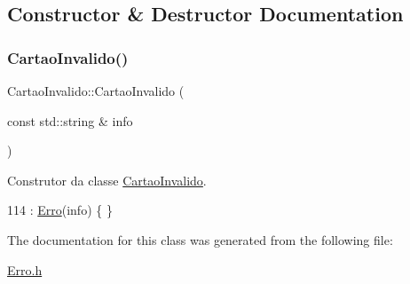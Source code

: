\subsection{Constructor \& Destructor Documentation}
\mbox{\label{classCartaoInvalido_a24653e20aedf639b42cd9ed8a56bdc83}} 
\subsubsection{\texorpdfstring{Cartao\+Invalido()}{CartaoInvalido()}}
{\footnotesize\ttfamily Cartao\+Invalido\+::\+Cartao\+Invalido (\begin{DoxyParamCaption}\item[{const std\+::string \&}]{info }\end{DoxyParamCaption})\hspace{0.3cm}{\ttfamily [inline]}}



Construtor da classe \hyperlink{classCartaoInvalido}{Cartao\+Invalido}. 


\begin{DoxyCode}
114 : \hyperlink{classErro_a15d79796bd17517ff05d45eee55556f1}{Erro}(info) \{ \}
\end{DoxyCode}


The documentation for this class was generated from the following file\+:\begin{DoxyCompactItemize}
\item 
\hyperlink{Erro_8h}{Erro.\+h}\end{DoxyCompactItemize}
